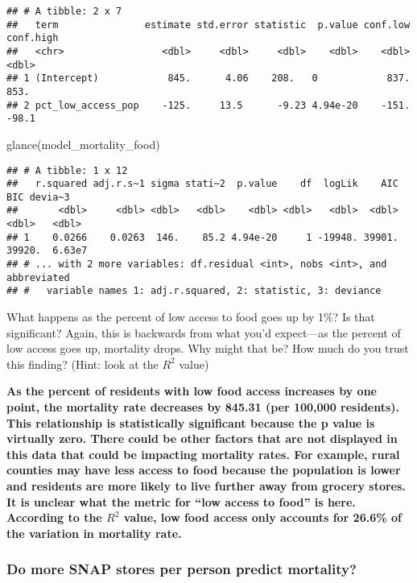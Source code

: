 \documentclass[
]{article}
\newenvironment{Shaded}{\begin{snugshade}}{\end{snugshade}}
\newcommand{\FunctionTok}[1]{\textcolor[rgb]{0.00,0.00,0.00}{#1}}
\newcommand{\NormalTok}[1]{#1}
\begin{document}
\begin{verbatim}
## # A tibble: 2 x 7
##   term               estimate std.error statistic  p.value conf.low conf.high
##   <chr>                 <dbl>     <dbl>     <dbl>    <dbl>    <dbl>     <dbl>
## 1 (Intercept)            845.      4.06    208.   0            837.     853. 
## 2 pct_low_access_pop    -125.     13.5      -9.23 4.94e-20    -151.     -98.1
\end{verbatim}

\begin{Shaded}
\begin{Highlighting}[]
\FunctionTok{glance}\NormalTok{(model\_mortality\_food)}
\end{Highlighting}
\end{Shaded}

\begin{verbatim}
## # A tibble: 1 x 12
##   r.squared adj.r.s~1 sigma stati~2  p.value    df  logLik    AIC    BIC devia~3
##       <dbl>     <dbl> <dbl>   <dbl>    <dbl> <dbl>   <dbl>  <dbl>  <dbl>   <dbl>
## 1    0.0266    0.0263  146.    85.2 4.94e-20     1 -19948. 39901. 39920.  6.63e7
## # ... with 2 more variables: df.residual <int>, nobs <int>, and abbreviated
## #   variable names 1: adj.r.squared, 2: statistic, 3: deviance
\end{verbatim}

What happens as the percent of low access to food goes up by 1\%? Is
that significant? Again, this is backwards from what you'd expect---as
the percent of low access goes up, mortality drops. Why might that be?
How much do you trust this finding? (Hint: look at the \(R^2\) value)

\textbf{As the percent of residents with low food access increases by
one point, the mortality rate decreases by 845.31 (per 100,000
residents). This relationship is statistically significant because the p
value is virtually zero. There could be other factors that are not
displayed in this data that could be impacting mortality rates. For
example, rural counties may have less access to food because the
population is lower and residents are more likely to live further away
from grocery stores. It is unclear what the metric for ``low access to
food'' is here. According to the \(R^2\) value, low food access only
accounts for 26.6\% of the variation in mortality rate.}

\hypertarget{do-more-snap-stores-per-person-predict-mortality}{%
\subsubsection{Do more SNAP stores per person predict
mortality?}\label{do-more-snap-stores-per-person-predict-mortality}}
\end{document}
